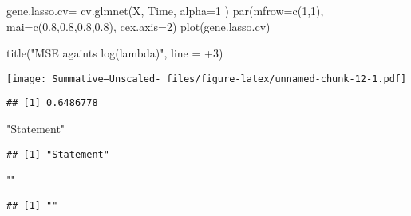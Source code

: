 \documentclass[
]{article}
\newenvironment{Shaded}{\begin{snugshade}}{\end{snugshade}}
\newcommand{\AttributeTok}[1]{\textcolor[rgb]{0.77,0.63,0.00}{#1}}
\newcommand{\DecValTok}[1]{\textcolor[rgb]{0.00,0.00,0.81}{#1}}
\newcommand{\FloatTok}[1]{\textcolor[rgb]{0.00,0.00,0.81}{#1}}
\newcommand{\FunctionTok}[1]{\textcolor[rgb]{0.00,0.00,0.00}{#1}}
\newcommand{\NormalTok}[1]{#1}
\newcommand{\OtherTok}[1]{\textcolor[rgb]{0.56,0.35,0.01}{#1}}
\newcommand{\SpecialCharTok}[1]{\textcolor[rgb]{0.00,0.00,0.00}{#1}}
\newcommand{\StringTok}[1]{\textcolor[rgb]{0.31,0.60,0.02}{#1}}
\begin{document}
\begin{Shaded}
\begin{Highlighting}[]
\NormalTok{gene.lasso.cv}\OtherTok{=} \FunctionTok{cv.glmnet}\NormalTok{(X, Time, }\AttributeTok{alpha=}\DecValTok{1}\NormalTok{ )}
\FunctionTok{par}\NormalTok{(}\AttributeTok{mfrow=}\FunctionTok{c}\NormalTok{(}\DecValTok{1}\NormalTok{,}\DecValTok{1}\NormalTok{), }\AttributeTok{mai=}\FunctionTok{c}\NormalTok{(}\FloatTok{0.8}\NormalTok{,}\FloatTok{0.8}\NormalTok{,}\FloatTok{0.8}\NormalTok{,}\FloatTok{0.8}\NormalTok{), }\AttributeTok{cex.axis=}\DecValTok{2}\NormalTok{)}
\FunctionTok{plot}\NormalTok{(gene.lasso.cv)}

\FunctionTok{title}\NormalTok{(}\StringTok{"MSE againts log(lambda)"}\NormalTok{, }\AttributeTok{line =} \SpecialCharTok{+}\DecValTok{3}\NormalTok{)}
\end{Highlighting}
\end{Shaded}

\texttt{[image: Summative--Unscaled-\_files/figure-latex/unnamed-chunk-12-1.pdf]}

\begin{Shaded}
\end{Shaded}

\begin{verbatim}
## [1] 0.6486778
\end{verbatim}

\begin{Shaded}
\begin{Highlighting}[]
\StringTok{"Statement"}
\end{Highlighting}
\end{Shaded}

\begin{verbatim}
## [1] "Statement"
\end{verbatim}

\begin{Shaded}
\begin{Highlighting}[]
\StringTok{""}
\end{Highlighting}
\end{Shaded}

\begin{verbatim}
## [1] ""
\end{verbatim}
\end{document}
